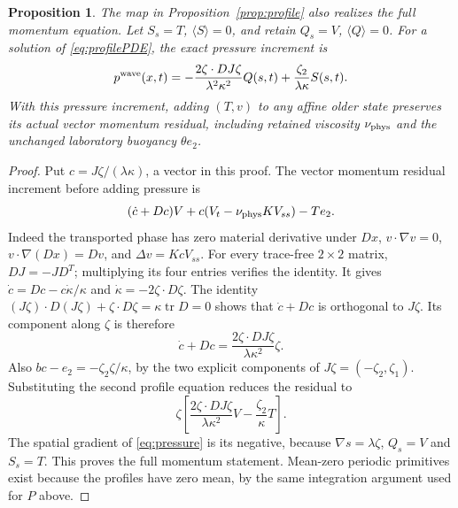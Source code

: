 \documentclass[11pt]{article}
\newtheorem{proposition}{Proposition}
\newcommand{\vis}{\nu_{\rm phys}}
\newcommand{\av}[1]{\langle #1\rangle}
\begin{document}
\begin{proposition}\label{prop:pressure}
The map in Proposition~\ref{prop:profile} also realizes the full momentum
equation. Let $S_s=T$, $\av S=0$, and retain $Q_s=V$, $\av Q=0$.
For a solution of \eqref{eq:profilePDE}, the exact pressure increment is
\begin{equation}\label{eq:pressure}
 p^{\rm wave}(x,t)=
 -\frac{2\zeta\cdot D J\zeta}{\lambda^2\kappa^2}Q(s,t)
 +\frac{\zeta_2}{\lambda\kappa}S(s,t).
\end{equation}
With this pressure increment, adding $(T,v)$ to any affine older state
preserves its actual vector momentum residual, including retained
viscosity $\vis$ and the unchanged laboratory buoyancy $\theta e_2$.
\end{proposition}
\begin{proof}
Put $c=J\zeta/(\lambda\kappa)$, a vector in this proof. The vector
momentum residual increment before adding pressure is
\[
 (\dot c+Dc)V+c(V_t-\vis K V_{ss})-Te_2.
\]
Indeed the transported phase has zero material derivative under $Dx$,
$v\cdot\nabla v=0$, $v\cdot\nabla(Dx)=Dv$, and
$\Delta v=KcV_{ss}$.
For every trace-free $2\times2$ matrix,
$DJ=-JD^T$; multiplying its four entries verifies the identity.
It gives $\dot c=Dc-c\dot\kappa/\kappa$ and
$\dot\kappa=-2\zeta\cdot D\zeta$.
The identity
$(J\zeta)\cdot D(J\zeta)+\zeta\cdot D\zeta
=\kappa\operatorname{tr}D=0$ shows that $\dot c+Dc$ is orthogonal to
$J\zeta$. Its component along $\zeta$ is therefore
\[
 \dot c+Dc=\frac{2\zeta\cdot D J\zeta}{\lambda\kappa^2}\zeta.
\]
Also $bc-e_2=-\zeta_2\zeta/\kappa$, by the two explicit components of
$J\zeta=(-\zeta_2,\zeta_1)$. Substituting the second profile equation
reduces the residual to
\[
 \zeta\left[
 \frac{2\zeta\cdot D J\zeta}{\lambda\kappa^2}V
 -\frac{\zeta_2}{\kappa}T\right].
\]
The spatial gradient of \eqref{eq:pressure} is its negative, because
$\nabla s=\lambda\zeta$, $Q_s=V$ and $S_s=T$.
This proves the full momentum statement. Mean-zero periodic primitives
exist because the profiles have zero mean, by the same integration
argument used for $P$ above.
\end{proof}
\end{document}
